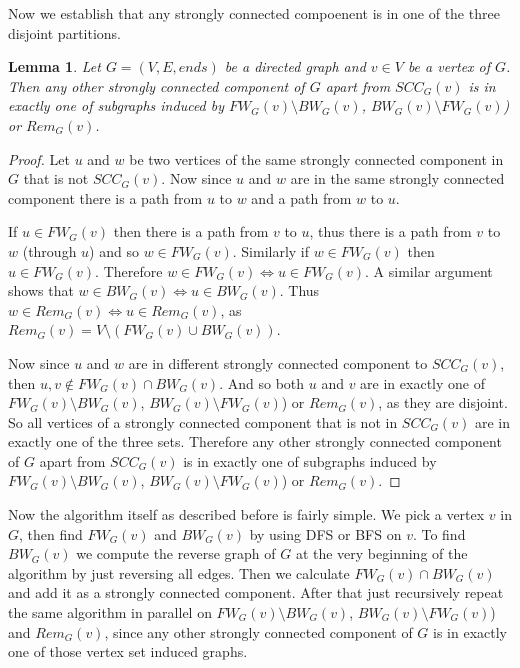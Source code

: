 \documentclass{report}
\theoremstyle{plain}
\newtheorem{lemma}{Lemma}
\theoremstyle{definition}
\theoremstyle{remark}
\numberwithin{definition}{chapter}
\numberwithin{example}{chapter}
\numberwithin{figure}{chapter}
\numberwithin{theorem}{chapter}
\numberwithin{lemma}{chapter}
\begin{document}
Now we establish that any strongly connected compoenent is in one of the three disjoint partitions.

\begin{lemma}
Let $G=(V, E, ends)$ be a directed graph and $v \in V$ be a vertex of $G$. Then any other strongly connected component of $G$ apart from $SCC_G(v)$ is in exactly one of subgraphs induced by $FW_G(v) \setminus BW_G(v)$, $BW_G(v) \setminus FW_G(v)$) or $Rem_G(v)$.
\label{fw_bw_l2}
\end{lemma}

\begin{proof}
Let $u$ and $w$ be two vertices of the same strongly connected component in $G$ that is not $SCC_G(v)$. Now since $u$ and $w$ are in the same strongly connected component there is a path from $u$ to $w$ and a path from $w$ to $u$.

If $u \in FW_G(v)$ then there is a path from $v$ to $u$, thus there is a path from $v$ to $w$ (through $u$) and so $w \in FW_G(v)$. Similarly if $w \in FW_G(v)$ then $u \in FW_G(v)$. Therefore $w \in FW_G(v) \Leftrightarrow u \in FW_G(v)$. A similar argument shows that $w \in BW_G(v) \Leftrightarrow u \in BW_G(v)$.
Thus $w \in Rem_G(v) \Leftrightarrow u \in Rem_G(v)$, as $Rem_G(v)=V \setminus (FW_G(v) \cup BW_G(v))$.

Now since $u$ and $w$ are in different strongly connected component to $SCC_G(v)$, then $u,v \not \in FW_G(v) \cap BW_G(v)$. And so both $u$ and $v$ are in exactly one of $FW_G(v) \setminus BW_G(v)$, $BW_G(v) \setminus FW_G(v)$) or $Rem_G(v)$, as they are disjoint. So all vertices of a strongly connected component that is not in $SCC_G(v)$ are in exactly one of the three sets. Therefore any other strongly connected component of $G$ apart from $SCC_G(v)$ is in exactly one of subgraphs induced by $FW_G(v) \setminus BW_G(v)$, $BW_G(v) \setminus FW_G(v)$) or $Rem_G(v)$.
\end{proof}

Now the algorithm itself as described before is fairly simple. We pick a vertex $v$ in $G$, then find $FW_G(v)$ and $BW_G(v)$ by using DFS or BFS on $v$. To find $BW_G(v)$ we compute the reverse graph of $G$ at the very beginning of the algorithm by just reversing all edges. Then we calculate $FW_G(v) \cap BW_G(v)$ and add it as a strongly connected component. After that just recursively repeat the same algorithm in parallel on $FW_G(v) \setminus BW_G(v)$, $BW_G(v) \setminus FW_G(v)$) and $Rem_G(v)$, since any other strongly connected component of $G$ is in exactly one of those vertex set induced graphs.
\end{document}
